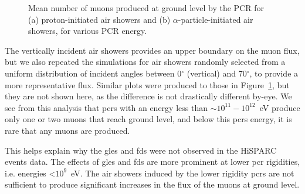 \begin{figure}[ht!]
	\centering
	\qquad
	\caption{Mean number of muons produced at ground level by the PCR for (a) proton-initiated air showers and (b) $\alpha$-particle-initiated air showers, for various PCR energy.}
	\label{fig:shower_muons}
\end{figure}

The vertically incident air showers provides an upper boundary on the muon flux, but we also repeated the simulations for air showers randomly selected from a uniform distribution of incident angles between 0$^\circ$ (vertical) and 70$^\circ$, to provide a more representative flux. Similar plots were produced to those in Figure~\ref{fig:shower_muons}, but they are not shown here, as the difference is not drastically different by-eye. We see from this analysis that \glspl{pcr} with an energy less than $\sim 10^{11}-10^{12}$~eV produce only one or two muons that reach ground level, and below this \glspl{pcr} energy, it is rare that any muons are produced.

This helps explain why the \glspl{gle} and \glspl{fd} were not observed in the HiSPARC events data. The effects of \glspl{gle} and \glspl{fd} are more prominent at lower \gls{pcr} rigidities, i.e. energies <$10^9$~eV. The air showers induced by the lower rigidity \glspl{pcr} are not sufficient to produce significant increases in the flux of the muons at ground level.

